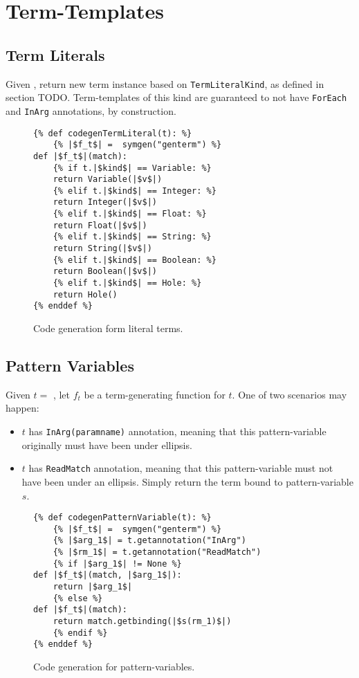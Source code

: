 \section{Term-Templates}

\subsection{Term Literals}

Given \TermLiteral, return new term instance based on \texttt{TermLiteralKind}, as defined in section TODO. Term-templates of this kind are guaranteed to not have \texttt{ForEach} and \texttt{InArg} annotations, by construction.

\begin{figure}[H]
\begin{verbatim}
{% def codegenTermLiteral(t): %}
	{% |$f_t$| =  symgen("genterm") %}
def |$f_t$|(match):
	{% if t.|$kind$| == Variable: %}
	return Variable(|$v$|)
	{% elif t.|$kind$| == Integer: %}
	return Integer(|$v$|)
	{% elif t.|$kind$| == Float: %}
	return Float(|$v$|)
	{% elif t.|$kind$| == String: %}
	return String(|$v$|)
	{% elif t.|$kind$| == Boolean: %}
	return Boolean(|$v$|)
	{% elif t.|$kind$| == Hole: %}
	return Hole()
{% enddef %}
\end{verbatim}
\caption{Code generation form literal terms.}
\label{codegen-term-template-lit}
\end{figure}


\subsection{Pattern Variables}

Given $t =$ \PatternVariable, let $f_t$ be a term-generating function for $t$. One of two scenarios may happen:
\begin{itemize}
\item $t$ has \texttt{InArg(paramname)} annotation, meaning that this pattern-variable originally must have been under ellipsis. 
\item $t$ has \texttt{ReadMatch} annotation, meaning that this pattern-variable must not have been under an ellipsis. Simply return the term bound to pattern-variable $s$.
\end{itemize}

\begin{figure}[htb]
\begin{verbatim}
{% def codegenPatternVariable(t): %}
	{% |$f_t$| =  symgen("genterm") %}
	{% |$arg_1$| = t.getannotation("InArg")
	{% |$rm_1$| = t.getannotation("ReadMatch")
	{% if |$arg_1$| != None %}
def |$f_t$|(match, |$arg_1$|):
	return |$arg_1$|
	{% else %}
def |$f_t$|(match):
	return match.getbinding(|$s(rm_1)$|)
	{% endif %}
{% enddef %}
\end{verbatim}
\caption{Code generation for pattern-variables.}
\label{codegen-term-pv}
\end{figure}

